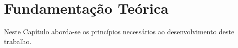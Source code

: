 
\chapter{Fundamentação Teórica}
\label{chap:fundamentacao}

Neste Capítulo aborda-se os princípios necessários ao desenvolvimento deste
trabalho.

